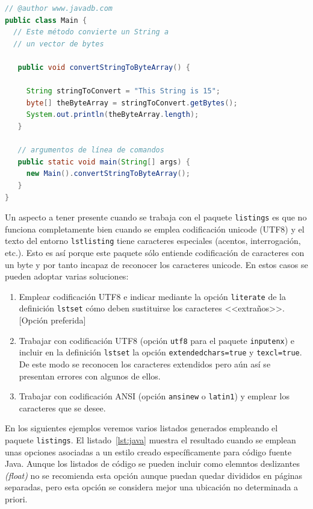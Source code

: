 \documentclass[ 		%
	11pt,				%
	a4paper,			%
	twoside,			%
	openright,			%
	final       		%
]{book}
\begin{document}
\begin{lstlisting}[language=Java,caption={[Código fuente en Java]Ejemplo de código fuente en lenguaje Java},label=lst:java]
// @author www.javadb.com
public class Main {    
  // Este método convierte un String a
  // un vector de bytes

   public void convertStringToByteArray() {
        
     String stringToConvert = "This String is 15";      
     byte[] theByteArray = stringToConvert.getBytes();        
     System.out.println(theByteArray.length);        
   }
    
   // argumentos de línea de comandos 
   public static void main(String[] args) {
     new Main().convertStringToByteArray();
   }
}
\end{lstlisting}

Un aspecto a tener presente cuando se trabaja con el paquete \texttt{listings} es que no funciona completamente bien cuando se emplea codificación unicode (UTF8) y el texto del entorno \texttt{lstlisting} tiene caracteres especiales (acentos, interrogación, etc.). Esto es así porque este paquete sólo entiende codificación de caracteres con un byte y por tanto incapaz de reconocer los caracteres unicode. En estos casos se pueden adoptar varias soluciones: 

\begin{enumerate}
	\item Emplear codificación UTF8 e indicar mediante la opción \texttt{literate} de la definición \texttt{lstset} cómo deben sustituirse los caracteres <<extraños>>. [Opción preferida]
	\item Trabajar con codificación UTF8 (opción \texttt{utf8} para el paquete \texttt{inputenx}) e incluir en la definición \texttt{lstset} la opción \texttt{extendedchars=true} y \texttt{texcl=true}. De este modo se reconocen los caracteres extendidos pero aún así se presentan errores con algunos de ellos.
	\item Trabajar con codificación ANSI (opción \texttt{ansinew} o \texttt{latin1}) y emplear los caracteres que se desee.
\end{enumerate}

En los siguientes ejemplos veremos varios listados generados empleando el paquete \texttt{listings}. El listado~\ref{lst:java} muestra el resultado cuando se emplean unas opciones asociadas a un estilo creado específicamente para código fuente Java. Aunque los listados de código se pueden incluir como elemntos deslizantes \emph{(float)} no se recomienda esta opción aunque puedan quedar divididos en páginas separadas, pero esta opción se considera mejor una ubicación no determinada a priori.
\end{document}
